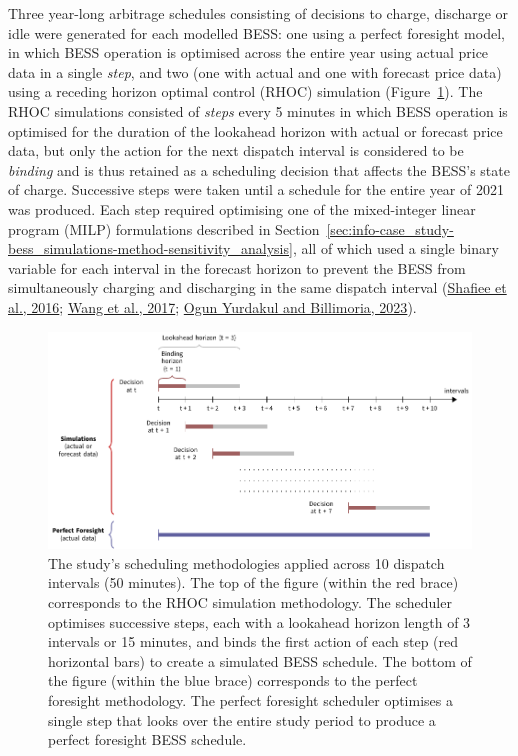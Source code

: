 \documentclass[12pt,a4paper,]{report}
\begin{document}
Three year-long arbitrage schedules consisting of decisions to charge,
discharge or idle were generated for each modelled BESS: one using a
perfect foresight model, in which BESS operation is optimised across the
entire year using actual price data in a single \emph{step}, and two
(one with actual and one with forecast price data) using a receding
horizon optimal control (RHOC) simulation
(Figure~\ref{fig:bess_schedules}). The RHOC simulations consisted of
\emph{steps} every 5 minutes in which BESS operation is optimised for
the duration of the lookahead horizon with actual or forecast price
data, but only the action for the next dispatch interval is considered
to be \emph{binding} and is thus retained as a scheduling decision that
affects the BESS's state of charge. Successive steps were taken until a
schedule for the entire year of 2021 was produced. Each step required
optimising one of the mixed-integer linear program (MILP) formulations
described in
Section~\ref{sec:info-case_study-bess_simulations-method-sensitivity_analysis},
all of which used a single binary variable for each interval in the
forecast horizon to prevent the BESS from simultaneously charging and
discharging in the same dispatch interval
(\protect\hyperlink{ref-shafieeEconomicAssessmentPricemaker2016}{Shafiee
et al., 2016};
\protect\hyperlink{ref-wangOptimalSchedulingEnergy2017}{Wang et al.,
2017};
\protect\hyperlink{ref-yurdakulRiskAverseSelfSchedulingStorage2023}{Ogun
Yurdakul and Billimoria, 2023}).

\begin{figure}
\hypertarget{fig:bess_schedules}{%
\centering
\includegraphics{source/figures/storage_simulations.pdf}
\caption[The study\textquotesingle s methodology for scheduling BESS
under imperfect and perfect foresight]{The study's scheduling
methodologies applied across 10 dispatch intervals (50 minutes). The top
of the figure (within the red brace) corresponds to the RHOC simulation
methodology. The scheduler optimises successive steps, each with a
lookahead horizon length of 3 intervals or 15 minutes, and binds the
first action of each step (red horizontal bars) to create a simulated
BESS schedule. The bottom of the figure (within the blue brace)
corresponds to the perfect foresight methodology. The perfect foresight
scheduler optimises a single step that looks over the entire study
period to produce a perfect foresight BESS
schedule.}\label{fig:bess_schedules}
}
\end{figure}
\end{document}
